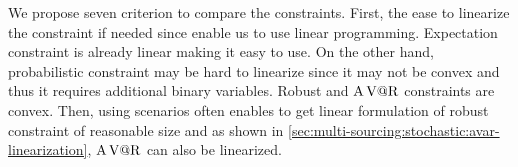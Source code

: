 

We propose seven criterion to compare the constraints.
First, the ease to linearize the constraint if needed since enable us to use linear programming.
Expectation constraint is already linear making it easy to use.
On the other hand, probabilistic constraint may be hard to linearize since it may not be convex and thus it requires additional binary variables.
Robust and $\operatorname{A\operatorname{V@R}}$ constraints are convex.
Then, using scenarios often enables to get linear formulation of robust constraint of reasonable size and as shown in \cref{sec:multi-sourcing:stochastic:avar-linearization}, $\operatorname{A\operatorname{V@R}}$ can also be linearized.


